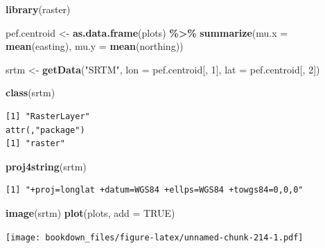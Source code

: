 \documentclass[
]{krantz}
\makeatletter
\newenvironment{Shaded}{\begin{snugshade}}{\end{snugshade}}
\newcommand{\DataTypeTok}[1]{\textcolor[rgb]{0.27,0.27,0.27}{#1}}
\newcommand{\DecValTok}[1]{\textcolor[rgb]{0.06,0.06,0.06}{#1}}
\newcommand{\KeywordTok}[1]{\textcolor[rgb]{0.27,0.27,0.27}{\textbf{#1}}}
\newcommand{\NormalTok}[1]{#1}
\newcommand{\OperatorTok}[1]{\textcolor[rgb]{0.43,0.43,0.43}{\textbf{#1}}}
\newcommand{\OtherTok}[1]{\textcolor[rgb]{0.37,0.37,0.37}{#1}}
\newcommand{\StringTok}[1]{\textcolor[rgb]{0.5,0.5,0.5}{#1}}
\newenvironment{kframe}{%
\medskip{}
\setlength{\fboxsep}{.8em}
 \def\at@end@of@kframe{}%
 \ifinner\ifhmode%
  \def\at@end@of@kframe{\end{minipage}}%
  \begin{minipage}{\columnwidth}%
 \fi\fi%
 \def\FrameCommand##1{\hskip\@totalleftmargin \hskip-\fboxsep
 \colorbox{shadecolor}{##1}\hskip-\fboxsep
     \hskip-\linewidth \hskip-\@totalleftmargin \hskip\columnwidth}%
 \MakeFramed {\advance\hsize-\width
   \@totalleftmargin\z@ \linewidth\hsize
   \@setminipage}}%
 {\par\unskip\endMakeFramed%
 \at@end@of@kframe}
\renewenvironment{Shaded}{\begin{kframe}}{\end{kframe}}
\makeatother
\begin{document}
\begin{Shaded}
\begin{Highlighting}[]
\KeywordTok{library}\NormalTok{(raster)}

\NormalTok{pef.centroid \textless{}{-}}\StringTok{ }\KeywordTok{as.data.frame}\NormalTok{(plots) }\OperatorTok{\%\textgreater{}\%}\StringTok{ }
\StringTok{    }\KeywordTok{summarize}\NormalTok{(}\DataTypeTok{mu.x =} \KeywordTok{mean}\NormalTok{(easting), }\DataTypeTok{mu.y =} \KeywordTok{mean}\NormalTok{(northing))}

\NormalTok{srtm \textless{}{-}}\StringTok{ }\KeywordTok{getData}\NormalTok{(}\StringTok{"SRTM"}\NormalTok{, }\DataTypeTok{lon =}\NormalTok{ pef.centroid[, }\DecValTok{1}\NormalTok{], }\DataTypeTok{lat =}\NormalTok{ pef.centroid[, }\DecValTok{2}\NormalTok{])}
\end{Highlighting}
\end{Shaded}

\begin{Shaded}
\begin{Highlighting}[]
\KeywordTok{class}\NormalTok{(srtm)}
\end{Highlighting}
\end{Shaded}

\begin{verbatim}
[1] "RasterLayer"
attr(,"package")
[1] "raster"
\end{verbatim}

\begin{Shaded}
\begin{Highlighting}[]
\KeywordTok{proj4string}\NormalTok{(srtm)}
\end{Highlighting}
\end{Shaded}

\begin{verbatim}
[1] "+proj=longlat +datum=WGS84 +ellps=WGS84 +towgs84=0,0,0"
\end{verbatim}

\begin{Shaded}
\begin{Highlighting}[]
\KeywordTok{image}\NormalTok{(srtm)}
\KeywordTok{plot}\NormalTok{(plots, }\DataTypeTok{add =} \OtherTok{TRUE}\NormalTok{)}
\end{Highlighting}
\end{Shaded}

\texttt{[image: bookdown\_files/figure-latex/unnamed-chunk-214-1.pdf]}
\end{document}

